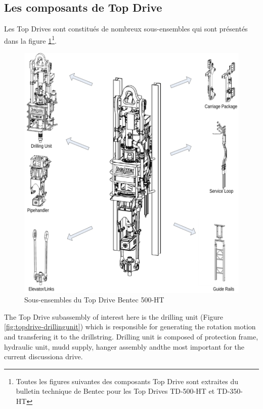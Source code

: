 \subsection{Les composants de Top Drive}%
\label{sub:top_drive_components}

Les Top Drives sont constitués de nombreux sous-ensembles qui sont présentés dans la figure \ref{fig:topdrive-subassemblies}\footnote{Toutes les figures suivantes des composants Top Drive sont extraites du bulletin technique de Bentec pour les Top Drives TD-500-HT et TD-350-HT}.

\begin{figure}[H]
	\centering
	\includegraphics[width=\linewidth]{figures/topdrive_subassemblies.png}
	\caption{Sous-ensembles du Top Drive Bentec 500-HT}%
	\label{fig:topdrive-subassemblies}
\end{figure}

The Top Drive subassembly of interest here is the drilling unit (Figure \ref{fig:topdrive-drillingunit}) which is responsible for generating the rotation motion and transfering it to the drillstring. Drilling unit is composed of protection frame, hydraulic unit, mudd supply, hanger assembly and\textemdash the most important for the current discussion\textemdash a drive.


